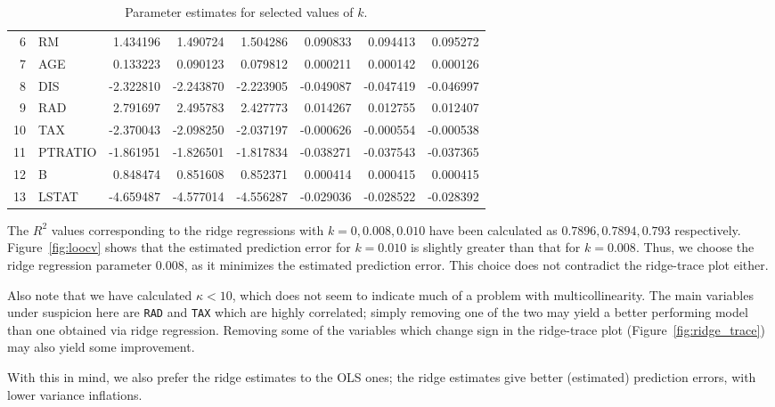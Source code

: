 \documentclass[10pt]{article}
\newcounter{prob}
\begin{document}
\begin{table}[H]
\begin{tabular}{|r|l|r|r|r|r|r|r|}
        6   & RM          & 1.434196      &  1.490724     & 1.504286  & 0.090833   & 0.094413  & 0.095272 \\
        7   & AGE         & 0.133223      &  0.090123     & 0.079812  & 0.000211   & 0.000142  & 0.000126 \\
        8   & DIS         &-2.322810      & -2.243870     &-2.223905  &-0.049087   &-0.047419  &-0.046997 \\
        9   & RAD         & 2.791697      &  2.495783     & 2.427773  & 0.014267   & 0.012755  & 0.012407 \\
        10  & TAX         &-2.370043      & -2.098250     &-2.037197  &-0.000626   &-0.000554  &-0.000538 \\
        11  & PTRATIO     &-1.861951      & -1.826501     &-1.817834  &-0.038271   &-0.037543  &-0.037365 \\
        12  & B           & 0.848474      &  0.851608     & 0.852371  & 0.000414   & 0.000415  & 0.000415 \\
        13  & LSTAT       &-4.659487      & -4.577014     &-4.556287  &-0.029036   &-0.028522  &-0.028392 \\\hline
    \end{tabular}
    \vspace{1em}
    \caption{Parameter estimates for selected values of $k$.}
    \label{tab:all_parameters}
    \end{table}

    The $R^2$ values corresponding to the ridge regressions with $k = 0, 0.008, 0.010$
    have been calculated as $0.7896, 0.7894, 0.793$ respectively.
    Figure~\ref{fig:loocv} shows that the estimated prediction error for $k =
    0.010$ is slightly greater than that for $k = 0.008$. Thus, we choose the ridge
    regression parameter $0.008$, as it minimizes the estimated prediction error.
    This choice does not contradict the ridge-trace plot either.

    Also note that we have calculated $\kappa < 10$, which does not seem to indicate
    much of a problem with multicollinearity. The main variables under suspicion here
    are \texttt{RAD} and \texttt{TAX} which are highly correlated; simply removing
    one of the two may yield a better performing model than one obtained via ridge
    regression. Removing some of the variables which change sign in the ridge-trace
    plot (Figure~\ref{fig:ridge_trace}) may also yield some improvement.

    With this in mind, we also prefer the ridge estimates to the OLS ones; the ridge
    estimates give better (estimated) prediction errors, with lower variance
    inflations.
\end{document}
